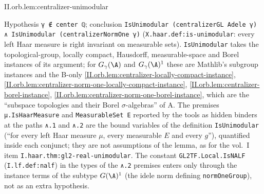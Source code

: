 \begin{lemma}[unimodularity]
\end{lemma}
\begin{tfformal}{II.orb.lem:centralizer-unimodular}
\begin{tffidelity}
Hypothesis \texttt{γ ∉ center ℚ}; conclusion \texttt{IsUnimodular (centralizerGL Adele γ) ∧ IsUnimodular (centralizerNormOne γ)} (\texttt{X.haar.def:is-unimodular}: every left Haar measure is right invariant on measurable sets). \texttt{IsUnimodular} takes the topological-group, locally compact, Hausdorff, measurable-space and Borel instances of its argument; for $G_\gamma(\A)$ and $G_\gamma(\A)^1$ these are Mathlib's subgroup instances and the B-only \cref{II.orb.lem:centralizer-locally-compact-instance}, \cref{II.orb.lem:centralizer-norm-one-locally-compact-instance}, \cref{II.orb.lem:centralizer-borel-instance}, \cref{II.orb.lem:centralizer-norm-one-borel-instance}, which are the ``subspace topologies and their Borel $\sigma$-algebras'' of A. The premises \texttt{μ.IsHaarMeasure} and \texttt{MeasurableSet E} reported by the tools as hidden binders at the paths \texttt{∧.1} and \texttt{∧.2} are the bound variables of the definition \texttt{IsUnimodular} (``for every left Haar measure $\mu$, every measurable $E$ and every $g$''), quantified inside each conjunct; they are not assumptions of the lemma, as for the vol.~I item \texttt{I.haar.thm:gl2-real-unimodular}. The constant \texttt{GL2TF.Local.IsNALF} (\texttt{I.lf.def:nalf}) in the types of the \texttt{∧.2} premises enters only through the instance terms of the subtype $G(\A)^1$ (the idele norm defining \texttt{normOneGroup}), not as an extra hypothesis.
\end{tffidelity}
\end{tfformal}
